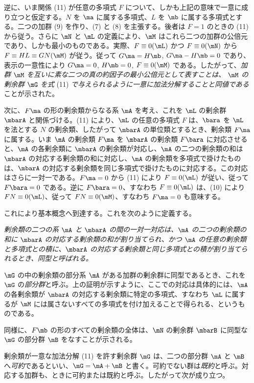 \documentclass[11pt]{article}
\begin{document}
逆に、いま関係 (11) が任意の多項式 $F$ について、しかも上記の意味で一意に成り立つと仮定する。$N$ を $\ma$ に属する多項式、$L$ を $\mb$ に属する多項式とする。二つの加群 (9) を作り、(7) と (8) を主張する。後者は $F=1$ のときの (11) から従う。さらに $\mN$ と $\mL$ の定義により、$\mM$ はこれら二つの加群の公倍元であり、しかも最小のものである。実際、$F\equiv0(\mL)$ かつ $F\equiv0(\mN)$ から $F\equiv HL\equiv GN(\mM)$ が従う。従って $G\ma=H\mb$, $G\ma-H\mb=0$ であり、表示の一意性により $G\ma=0$, $H\mb=0$, $F\equiv0(\mM)$ である。したがって、\emph{加群} $\mM$ \emph{を互いに素な二つの真の約因子の最小公倍元として表すことは、} $\mM$ \emph{の剰余群} $\mG$ \emph{を式} (11) \emph{で与えられるように一意に加法分解することと同値である}ことが示された。

次に、$F\ma$ の形の剰余類からなる系 $\mA$ を考え、これを $\mL$ の剰余群 $\mbarA$ と関係づける。(11) により、$\mL$ の任意の多項式 $F$ は、$\bara$ を $\mL$ を法とする $N$ の剰余類、したがって $\mbarA$ の単位類とするとき、剰余類 $F\ma$ に属する。いま $\mA$ の剰余類 $F\ma$ を $\mbarA$ の剰余類 $F\bara$ に対応させると、$\mA$ の各剰余類に $\mbarA$ の剰余類が対応し、$\mA$ の二つの剰余類の和は $\mbarA$ の対応する剰余類の和に対応し、$\mA$ の剰余類を多項式で掛けたものは、$\mbarA$ の対応する剰余類を同じ多項式で掛けたものに対応する。この対応はさらに一対一である。$F\ma=0$ から (11) により $F\equiv0(\mL)$ が従い、従って $F\bara=0$ である。逆に $F\bara=0$、すなわち $F\equiv0(\mL)$ は、(10) により $FN\equiv0(\mL)$、従って $FN\equiv0(\mM)$、すなわち $F\ma=0$ も意味する。

これにより基本概念へ到達する。これを次のように定義する。

\emph{剰余類の二つの系 $\mA$ と $\mbarA$ の間の一対一対応は、$\mA$ の二つの剰余類の和に $\mbarA$ の対応する剰余類の和が割り当てられ、かつ $\mA$ の任意の剰余類と多項式との積に、$\mbarA$ の対応する剰余類と同じ多項式との積が割り当てられるとき、同型と呼ばれる。}

$\mG$ の中の剰余類の部分系 $\mA$ がある加群の剰余群に同型であるとき、これを $\mG$ の\emph{部分群}と呼ぶ。上の証明が示すように、ここでの対応は具体的には、$\mA$ の各剰余類が $\mbarA$ の対応する剰余類に特定の多項式、すなわち $\mL$ に属するが $\mM$ には属さないすべての多項式を付け加えることで得られる、というものである。

同様に、$F\mb$ の形のすべての剰余類の全体は、$\mN$ の剰余群 $\mbarB$ に同型な $\mG$ の部分群 $\mB$ をなすことが示される。

剰余類が一意な加法分解 (11) を許す剰余群 $\mG$ は、二つの部分群 $\mA$ と $\mB$ へ\emph{可約}であるといい、$\mG=\mA+\mB$ と書く。可約でない群は\emph{既約}と呼ぶ。対応する加群も、ときに可約または既約と呼ぶ。したがって次が成り立つ。
\end{document}
